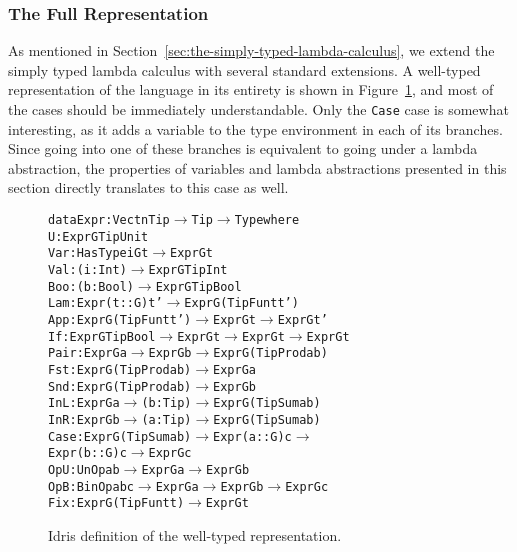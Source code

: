\subsubsection{The Full Representation}
As mentioned in Section~\ref{sec:the-simply-typed-lambda-calculus}, we extend the simply typed lambda calculus with several standard extensions. A well-typed representation of the language in its entirety is shown in Figure~\ref{fig:idris-def-expr-lang}, and most of the cases should be immediately understandable. Only the \texttt{Case} case is somewhat interesting, as it adds a variable to the type environment in each of its branches. Since going into one of these branches is equivalent to going under a lambda abstraction, the properties of variables and lambda abstractions presented in this section directly translates to this case as well.

\begin{figure}
\begin{alltt}
  data Expr : Vect n Tip \(\rightarrow\) Tip \(\rightarrow\) Type where
    U    : Expr G TipUnit
    Var  : HasType i G t \(\rightarrow\) Expr G t
    Val  : (i : Int) \(\rightarrow\) Expr G TipInt
    Boo  : (b : Bool) \(\rightarrow\) Expr G TipBool
    Lam  : Expr (t :: G) t' \(\rightarrow\) Expr G (TipFun t t')
    App  : Expr G (TipFun t t') \(\rightarrow\) Expr G t \(\rightarrow\) Expr G t'
    If   : Expr G TipBool \(\rightarrow\) Expr G t \(\rightarrow\) Expr G t \(\rightarrow\) Expr G t
    Pair : Expr G a \(\rightarrow\) Expr G b \(\rightarrow\) Expr G (TipProd a b)
    Fst  : Expr G (TipProd a b) \(\rightarrow\) Expr G a
    Snd  : Expr G (TipProd a b) \(\rightarrow\) Expr G b
    InL  : Expr G a \(\rightarrow\) (b: Tip) \(\rightarrow\) Expr G (TipSum a b)
    InR  : Expr G b \(\rightarrow\) (a: Tip) \(\rightarrow\) Expr G (TipSum a b)
    Case : Expr G (TipSum a b) \(\rightarrow\) Expr (a :: G) c \(\rightarrow\)
           Expr (b :: G) c \(\rightarrow\) Expr G c
    OpU  : UnOp a b \(\rightarrow\) Expr G a \(\rightarrow\) Expr G b
    OpB  : BinOp a b c \(\rightarrow\) Expr G a \(\rightarrow\) Expr G b \(\rightarrow\) Expr G c
    Fix  : Expr G (TipFun t t) \(\rightarrow\) Expr G t
\end{alltt}
\caption{Idris definition of the well-typed representation.}
\label{fig:idris-def-expr-lang}
\end{figure}



